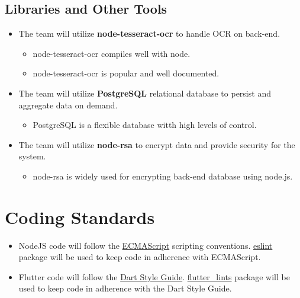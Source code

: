 \documentclass{article}
\begin{document}
\subsection{Libraries and Other Tools}
    \begin{itemize}
        \item The team will utilize \textbf{node-tesseract-ocr} to handle OCR on back-end.
        \begin{itemize}
            \item node-tesseract-ocr compiles well with node.
            \item node-tesseract-ocr is popular and well documented.
        \end{itemize}
        \item The team will utilize \textbf{PostgreSQL} relational database to persist and aggregate data on demand.
        \begin{itemize}
            \item PostgreSQL is a flexible database witth high levels of control.
        \end{itemize}
        \item The team will utilize \textbf{node-rsa} to encrypt data and provide security for the system.
        \begin{itemize}
            \item node-rsa is widely used for encrypting back-end database using node.js.
        \end{itemize}
    \end{itemize}

\section{Coding Standards}

\begin{itemize}
\item NodeJS code will follow the \href{https://www.ecma-international.org/publications-and-standards/standards/ecma-262/}{ECMAScript} scripting conventions. \href{https://www.npmjs.com/package/eslint}{eslint} package will be used to keep code in adherence with ECMAScript.
\item Flutter code will follow the \href{https://dart.dev/effective-dart/style}{Dart Style Guide}. \href{https://pub.dev/packages/flutter_lints}{flutter\_lints} package will be used to keep code in adherence with the Dart Style Guide.
\end{itemize}
\end{document}
